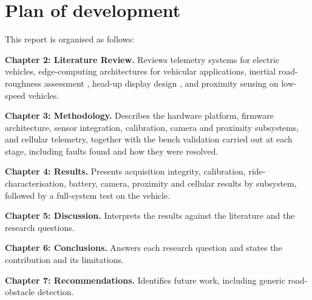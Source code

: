 \section{Plan of development}

This report is organised as follows:

\textbf{Chapter 2: Literature Review.} Reviews telemetry systems for electric vehicles, edge-computing architectures for vehicular applications, inertial road-roughness assessment \cite{alatoom2025, bui2026}, head-up display design \cite{mareska2022, canomarin2016, hauslschmid2016}, and proximity sensing on low-speed vehicles.

\textbf{Chapter 3: Methodology.} Describes the hardware platform, firmware architecture, sensor integration, calibration, camera and proximity subsystems, and cellular telemetry, together with the bench validation carried out at each stage, including faults found and how they were resolved.

\textbf{Chapter 4: Results.} Presents acquisition integrity, calibration, ride-characterisation, battery, camera, proximity and cellular results by subsystem, followed by a full-system test on the vehicle.

\textbf{Chapter 5: Discussion.} Interprets the results against the literature and the research questions.

\textbf{Chapter 6: Conclusions.} Answers each research question and states the contribution and its limitations.

\textbf{Chapter 7: Recommendations.} Identifies future work, including generic road-obstacle detection.

